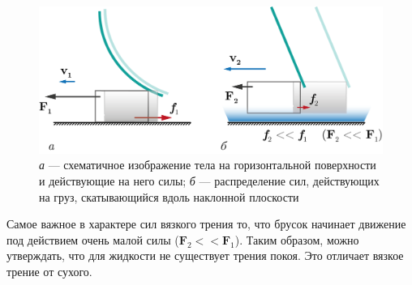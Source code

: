 \documentclass[14pt,a4paper,oneside]{extarticle}	%
\begin{document}
	\begin{figure}[H] 
	\centering 	
	\includegraphics[width=0.9\linewidth]{friction-3.png}
	\caption{\textit{а} — схематичное изображение тела на горизонтальной поверхности и действующие на него силы; \textit{б} — распределение сил, действующих на груз, скатывающийся вдоль наклонной плоскости}
	\label{friction-3}
\end{figure}

Самое важное в характере сил вязкого трения то, что брусок начинает движение под действием очень малой силы ($ \textbf{F}_2 << \textbf{F}_1 $).
Таким образом, можно утверждать, что для жидкости не существует трения покоя. 
Это отличает вязкое трение от сухого.
	
\end{document}
